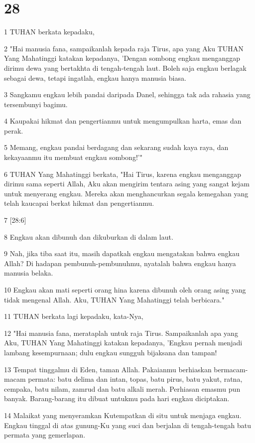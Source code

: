 \chapter{28}

\par 1 TUHAN berkata kepadaku,
\par 2 "Hai manusia fana, sampaikanlah kepada raja Tirus, apa yang Aku TUHAN Yang Mahatinggi katakan kepadanya, 'Dengan sombong engkau menganggap dirimu dewa yang bertakhta di tengah-tengah laut. Boleh saja engkau berlagak sebagai dewa, tetapi ingatlah, engkau hanya manusia biasa.
\par 3 Sangkamu engkau lebih pandai daripada Danel, sehingga tak ada rahasia yang tersembunyi bagimu.
\par 4 Kaupakai hikmat dan pengertianmu untuk mengumpulkan harta, emas dan perak.
\par 5 Memang, engkau pandai berdagang dan sekarang sudah kaya raya, dan kekayaanmu itu membuat engkau sombong!'"
\par 6 TUHAN Yang Mahatinggi berkata, "Hai Tirus, karena engkau menganggap dirimu sama seperti Allah, Aku akan mengirim tentara asing yang sangat kejam untuk menyerang engkau. Mereka akan menghancurkan segala kemegahan yang telah kaucapai berkat hikmat dan pengertianmu.
\par 7 [28:6]
\par 8 Engkau akan dibunuh dan dikuburkan di dalam laut.
\par 9 Nah, jika tiba saat itu, masih dapatkah engkau mengatakan bahwa engkau Allah? Di hadapan pembunuh-pembunuhmu, nyatalah bahwa engkau hanya manusia belaka.
\par 10 Engkau akan mati seperti orang hina karena dibunuh oleh orang asing yang tidak mengenal Allah. Aku, TUHAN Yang Mahatinggi telah berbicara."
\par 11 TUHAN berkata lagi kepadaku, kata-Nya,
\par 12 "Hai manusia fana, merataplah untuk raja Tirus. Sampaikanlah apa yang Aku, TUHAN Yang Mahatinggi katakan kepadanya, 'Engkau pernah menjadi lambang kesempurnaan; dulu engkau sungguh bijaksana dan tampan!
\par 13 Tempat tinggalmu di Eden, taman Allah. Pakaianmu berhiaskan bermacam-macam permata: batu delima dan intan, topas, batu pirus, batu yakut, ratna, cempaka, batu nilam, zamrud dan batu alkali merah. Perhiasan emasmu pun banyak. Barang-barang itu dibuat untukmu pada hari engkau diciptakan.
\par 14 Malaikat yang menyeramkan Kutempatkan di situ untuk menjaga engkau. Engkau tinggal di atas gunung-Ku yang suci dan berjalan di tengah-tengah batu permata yang gemerlapan.
